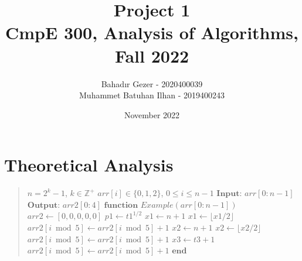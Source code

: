 \documentclass[10pt]{article}
\title{\vspace{-1cm} \Huge Project 1 \\ \LARGE CmpE 300, Analysis of Algorithms, Fall 2022 }
\author{
    Bahadır Gezer - 2020400039 \\
    Muhammet Batuhan Ilhan - 2019400243 \\
}
\date{November 2022}
\begin{document}
\maketitle
  
\tableofcontents
\clearpage


\section{Theoretical Analysis}

\begin{quote}
\begin{algorithmic}[1]
\Require $n = 2^{k}-1$, $k \in \mathbb{Z}^{+}$
\Require $arr[i] \in \{0,1,2\}$, $0 \leq i \leq n-1$
\State $\textbf{Input: } arr[0:n-1]$ 
\State $\textbf{Output: } arr2[0:4]$ 
\State $\textbf{function }Example(arr[0:n-1])$
\State 
\State $arr2 \gets [0,0,0,0,0]$
            \State $p1 \gets t1^{1/2}$
            \State $x1 \gets n + 1$
                \State $x1 \gets \lfloor x1 / 2 \rfloor$
                \State $arr2[i \bmod 5] \gets arr2[i \bmod 5] + 1$
            \EndWhile
        \EndFor
                \State $x2 \gets n + 1$
                    \State $x2 \gets \lfloor x2 / 2 \rfloor$
                    \State $arr2[i \bmod 5] \gets arr2[i \bmod 5] + 1$
                \EndWhile
            \EndFor
        \EndFor
            \State $x3 \gets t3 + 1$
                \State $arr2[i \bmod 5] \gets arr2[i \bmod 5] + 1$
            \EndFor
        \EndFor
    \EndIf
\EndFor
\State $\textbf{end}$
\end{algorithmic}
\end{quote}
\end{document}
